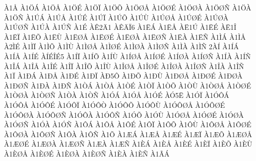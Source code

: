 {^^c01^^c5
^^c01^^d6^^c1
^^c01^^d6^^c5
^^c01^^d6^^c9
^^c01^^d6^^cf
^^c01^^d6^^d5
^^c01^^d6^^d8^^c5
^^c01^^d6^^d8^^c9
^^c01^^d6^^d8^^c0
^^c01^^d6^^d8^^d1
^^c01^^d6^^c0
^^c01^^d6^^d1
^^c01^^da^^c1
^^c01^^da^^c5
^^c01^^da^^c9
^^c01^^da^^cf
^^c01^^da^^d5
^^c01^^da^^d9
^^c01^^da^^d8^^c5
^^c01^^da^^d8^^c9
^^c01^^da^^d8^^c0
^^c01^^da^^d8^^d1
^^c01^^da^^c0
^^c01^^da^^d1
^^c01^^c9
^^c0^^ca2^^c41
^^c0^^ca^^c4^^cf6
^^c01^^cb^^c1
^^c01^^cb^^c5
^^c0^^cb1^^da
^^c01^^cb^^c9
^^c0^^cb1^^ce
^^c01^^cb^^cf
^^c01^^cb^^d5
^^c01^^cb^^d9
^^c01^^cb^^d8^^c5
^^c01^^cb^^d8^^c9
^^c01^^cb^^d8^^c0
^^c01^^cb^^d8^^d1
^^c01^^cb^^c0
^^c01^^cb^^d1
^^c01^^cc^^c1
^^c01^^cc^^c5
^^c02^^cc^^c9
^^c01^^cc^^cf
^^c01^^cc^^d5
^^c01^^cc^^d9
^^c01^^cc^^d8^^c5
^^c01^^cc^^d8^^c9
^^c01^^cc^^d8^^c0
^^c01^^cc^^d8^^d1
^^c01^^cc^^c0
^^c01^^cc^^d1
2^^c0^^cd
^^c01^^cd^^c1
^^c01^^cd^^c5
^^c01^^cd^^c9
^^c0^^cd^^c9^^ce^^c95
^^c01^^cd^^cf
^^c01^^cd^^d5
^^c01^^cd^^d9
^^c01^^cd^^d8^^c5
^^c01^^cd^^d8^^c9
^^c01^^cd^^d8^^c0
^^c01^^cd^^d8^^d1
^^c01^^cd^^c0
^^c01^^cd^^d1
^^c01^^ce^^c1
^^c01^^ce^^c5
^^c01^^ce^^c9
^^c01^^ce^^cf
^^c01^^ce^^d5
^^c01^^ce^^d9
^^c01^^ce^^d8^^c5
^^c01^^ce^^d8^^c9
^^c01^^ce^^d8^^c0
^^c01^^ce^^d8^^d1
^^c01^^ce^^c0
^^c01^^ce^^d1
^^c01^^cf
^^c01^^d0^^c1
^^c01^^d0^^c5
^^c01^^d0^^c9
^^c01^^d0^^cf
^^c0^^d05^^d4
^^c01^^d0^^d5
^^c01^^d0^^d9
^^c01^^d0^^d8^^c5
^^c01^^d0^^d8^^c9
^^c01^^d0^^d8^^c0
^^c01^^d0^^d8^^d1
^^c01^^d0^^c0
^^c01^^d0^^d1
^^c01^^d2^^c1
^^c01^^d2^^c5
^^c01^^d2^^c9
^^c01^^d2^^cf
^^c01^^d2^^d5
^^c01^^d2^^d9
^^c01^^d2^^d8^^c5
^^c01^^d2^^d8^^c9
^^c01^^d2^^d8^^c0
^^c01^^d2^^d8^^d1
^^c01^^d2^^c0
^^c01^^d2^^d1
^^c01^^d3^^c1
^^c01^^d3^^c5
^^c01^^d3^^c9
^^c0^^d35^^cb
^^c01^^d3^^cf
^^c01^^d3^^d4^^c1
^^c01^^d3^^d4^^c5
^^c01^^d3^^d4^^c9
^^c01^^d3^^d4^^cf
^^c01^^d3^^d4^^d2
^^c01^^d3^^d4^^d5
^^c01^^d3^^d4^^d9
^^c01^^d3^^d4^^d8^^c5
^^c01^^d3^^d4^^d8^^c9
^^c01^^d3^^d4^^d8^^c0
^^c01^^d3^^d4^^d8^^d1
^^c01^^d3^^d4^^c0
^^c01^^d3^^d4^^d1
^^c01^^d3^^d5
^^c01^^d3^^d9
^^c01^^d3^^d8^^c5
^^c01^^d3^^d8^^c9
^^c01^^d3^^d8^^c0
^^c01^^d3^^d8^^d1
^^c01^^d3^^c0
^^c01^^d3^^d1
^^c01^^d4^^c1
^^c01^^d4^^c5
^^c01^^d4^^c9
^^c01^^d4^^cf
^^c01^^d4^^d5
^^c01^^d4^^d9
^^c01^^d4^^d8^^c5
^^c01^^d4^^d8^^c9
^^c01^^d4^^d8^^c0
^^c01^^d4^^d8^^d1
^^c01^^d4^^c0
^^c01^^d4^^d1
^^c01^^d5
^^c01^^c6^^c1
^^c01^^c6^^c5
^^c01^^c6^^c9
^^c01^^c6^^cf
^^c01^^c6^^d5
^^c01^^c6^^d8^^c5
^^c01^^c6^^d8^^c9
^^c01^^c6^^d8^^c0
^^c01^^c6^^d8^^d1
^^c01^^c6^^c0
^^c01^^c6^^d1
^^c01^^c8^^c1
^^c01^^c8^^c5
^^c01^^c8^^c9
^^c01^^c8^^cf
^^c01^^c8^^d5
^^c01^^c8^^d9
^^c01^^c8^^d8^^c5
^^c01^^c8^^d8^^c9
^^c01^^c8^^d8^^c0
^^c01^^c8^^d8^^d1
^^c01^^c8^^c0
^^c01^^c8^^d1
^^c01^^c3^^c1
}
